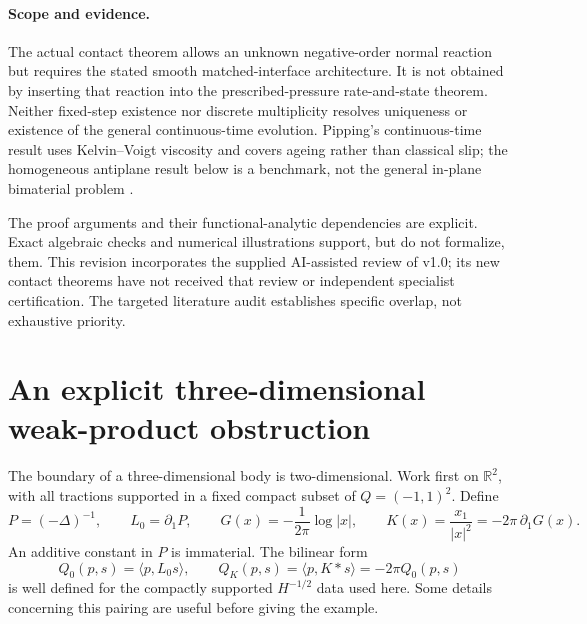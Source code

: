 \documentclass[11pt,a4paper]{article}
\theoremstyle{definition}\newtheorem{definition}[theorem]{Definition}
\theoremstyle{remark}\newtheorem{remark}[theorem]{Remark}
\newcommand{\R}{\mathbb R}
\newcommand{\ip}[2]{\langle #1,#2\rangle}
\numberwithin{equation}{section}
\begin{document}
\paragraph{Scope and evidence.}
The actual contact theorem allows an unknown negative-order normal reaction but requires the stated smooth matched-interface architecture. It is not obtained by inserting that reaction into the prescribed-pressure rate-and-state theorem. Neither fixed-step existence nor discrete multiplicity resolves uniqueness or existence of the general continuous-time evolution. Pipping's continuous-time result \cite{Pipping2019} uses Kelvin--Voigt viscosity and covers ageing rather than classical slip; the homogeneous antiplane result below is a benchmark, not the general in-plane bimaterial problem \cite{RR,RLR}.

The proof arguments and their functional-analytic dependencies are explicit. Exact algebraic checks and numerical illustrations support, but do not formalize, them. This revision incorporates the supplied AI-assisted review of v1.0; its new contact theorems have not received that review or independent specialist certification. The targeted literature audit establishes specific overlap, not exhaustive priority.

\section{An explicit three-dimensional weak-product obstruction}\label{sec:counter}
The boundary of a three-dimensional body is two-dimensional. Work first on $\R^2$, with all tractions supported in a fixed compact subset of $Q=(-1,1)^2$. Define
\begin{equation}\label{eq:kernel}
 P=(-\Delta)^{-1},\qquad
 L_0=\partial_1P,\qquad
 G(x)=-\frac{1}{2\pi}\log|x|,\qquad
 K(x)=\frac{x_1}{|x|^2}=-2\pi\,\partial_1G(x).
\end{equation}
An additive constant in $P$ is immaterial. The bilinear form
\begin{equation}\label{eq:Q}
 Q_0(p,s)=\ip{p}{L_0s},\qquad Q_K(p,s)=\ip{p}{K*s}=-2\pi Q_0(p,s)
\end{equation}
is well defined for the compactly supported $H^{-1/2}$ data used here. Some details concerning this pairing are useful before giving the example.
\end{document}
